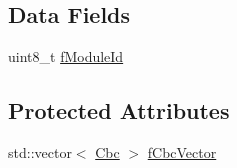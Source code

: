 \subsection*{Data Fields}
\begin{DoxyCompactItemize}
\item 
uint8\-\_\-t \hyperlink{class_ph2___hw_description_1_1_module_a8bf42ae708d304acbc5509edf7f7cee0}{f\-Module\-Id}
\end{DoxyCompactItemize}
\subsection*{Protected Attributes}
\begin{DoxyCompactItemize}
\item 
std\-::vector$<$ \hyperlink{class_ph2___hw_description_1_1_cbc}{Cbc} $>$ \hyperlink{class_ph2___hw_description_1_1_module_ab5cfd93bf927592f609d31f66cd4161b}{f\-Cbc\-Vector}
\end{DoxyCompactItemize}


